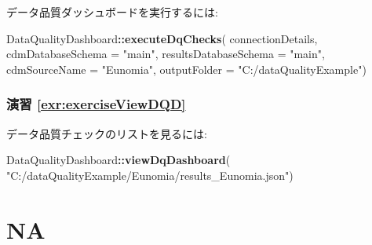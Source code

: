 \documentclass[
  11pt]{book}
\newenvironment{Shaded}{\begin{snugshade}}{\end{snugshade}}
\newcommand{\AttributeTok}[1]{\textcolor[rgb]{0.13,0.29,0.53}{#1}}
\newcommand{\FunctionTok}[1]{\textcolor[rgb]{0.13,0.29,0.53}{\textbf{#1}}}
\newcommand{\NormalTok}[1]{#1}
\newcommand{\SpecialCharTok}[1]{\textcolor[rgb]{0.81,0.36,0.00}{\textbf{#1}}}
\newcommand{\StringTok}[1]{\textcolor[rgb]{0.31,0.60,0.02}{#1}}
\theoremstyle{definition}
\theoremstyle{definition}
\theoremstyle{definition}
\theoremstyle{definition}
\theoremstyle{remark}
\begin{document}
データ品質ダッシュボードを実行するには:

\begin{Shaded}
\begin{Highlighting}[]
\NormalTok{DataQualityDashboard}\SpecialCharTok{::}\FunctionTok{executeDqChecks}\NormalTok{(}
\NormalTok{  connectionDetails,}
  \AttributeTok{cdmDatabaseSchema =} \StringTok{"main"}\NormalTok{,}
  \AttributeTok{resultsDatabaseSchema =} \StringTok{"main"}\NormalTok{,}
  \AttributeTok{cdmSourceName =} \StringTok{"Eunomia"}\NormalTok{,}
  \AttributeTok{outputFolder =} \StringTok{"C:/dataQualityExample"}\NormalTok{)}
\end{Highlighting}
\end{Shaded}

\subsubsection*{演習 \ref{exr:exerciseViewDQD}}\label{ux6f14ux7fd2-refexrexerciseviewdqd}

データ品質チェックのリストを見るには:

\begin{Shaded}
\begin{Highlighting}[]
\NormalTok{DataQualityDashboard}\SpecialCharTok{::}\FunctionTok{viewDqDashboard}\NormalTok{(}
  \StringTok{"C:/dataQualityExample/Eunomia/results\_Eunomia.json"}\NormalTok{)}
\end{Highlighting}
\end{Shaded}

\section{}\label{section}

\section{NA}\label{na}

  

\backmatter
\printindex
\end{document}
